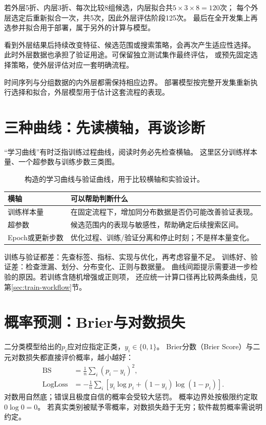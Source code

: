 若外层5折、内层3折、每次比较8组候选，内层拟合共$5\times3\times8=120$次；
每个外层选定后重新拟合一次，共5次，因此外层评估阶段125次。
最后在全开发集上再选参并拟合用于部署，属于另外的计算与模型。

\begin{pitfall}[根据外层结果继续选择]
看到外层结果后持续改变特征、候选范围或搜索策略，会再次产生适应性选择。
此时外层数据也承担了验证用途。可保留独立测试集作最终评估，
或预先固定选择策略，使外层评估对应一套明确流程。
\end{pitfall}

时间序列与分组数据的内外层都需保持相应边界。
部署模型按完整开发集重新执行选择和拟合，外层模型用于估计这套流程的表现。

\section{三种曲线：先读横轴，再谈诊断}
\label{sec:diag-curves}
“学习曲线”有时泛指训练过程曲线，阅读时务必先检查横轴。
这里区分训练样本量、一个超参数与训练步数三类图。

\begin{figure}[htbp]
\centering
\caption{构造的学习曲线与验证曲线，用于比较横轴和实验设计。}
\par\smallskip
{}
\end{figure}

\begin{center}
\begin{tabularx}{\textwidth}{P{33mm}Y}
\toprule
横轴 & 可以帮助判断什么\\
\midrule
训练样本量 & 在固定流程下，增加同分布数据是否仍可能改善验证表现。\\
超参数 & 候选范围内的表现与敏感性，帮助确定后续搜索区间。\\
Epoch或更新步数 & 优化过程、训练/验证分离和停止时刻；不是样本量变化。\\
\bottomrule
\end{tabularx}
\end{center}

训练与验证都差：先查标签、指标、实现与优化，再考虑容量不足。
训练好、验证差：检查泄漏、划分、分布变化、正则与数据量。
曲线间距提示需要进一步检验的原因。若训练含随机增强或正则项，
还应统一计算口径再比较两条曲线，见第\ref{sec:train-workflow}节。

\section{概率预测：Brier与对数损失}
\label{sec:diag-probability}
二分类模型给出的$p_i$应对应指定正类，$y_i\in\{0,1\}$。
Brier分数（Brier Score）与二元对数损失都直接评价概率，越小越好：
\begin{align}
 \mathrm{BS}&=\frac1n\sum_i(p_i-y_i)^2,\\
 \mathrm{LogLoss}&=-\frac1n\sum_i[y_i\log p_i+(1-y_i)\log(1-p_i)].
\end{align}
对数用自然底；错误且极度自信的概率会受较大惩罚。
概率边界处按极限约定取$0\log0=0$。
若真实类别被赋予零概率，对数损失趋于无穷；软件裁剪概率需说明约定。

